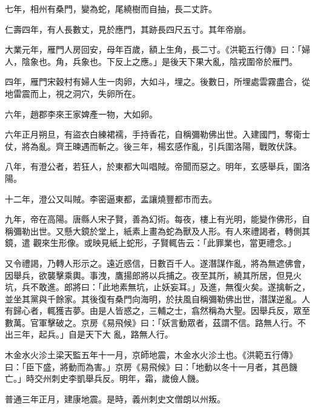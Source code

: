 \begin{pinyinscope}
 七年，相州有桑門，變為蛇，尾繞樹而自抽，長二丈許。



 仁壽四年，有人長數丈，見於應門，其跡長四尺五寸。其年帝崩。



 大業元年，雁門人房回安，母年百歲，額上生角，長二寸。《洪範五行傳》曰：「婦人，陰象也。角，兵象也。下反上之應。」是後天下果大亂，陰戎圍帝於雁門。



 四年，雁門宋穀村有婦人生一肉卵，大如斗，埋之。後數日，所埋處雲霧盡合，從地雷震而上，視之洞穴，失卵所在。



 六年，趙郡李來王家婢產一物，大如卵。



 六年正月朔旦，有盜衣白練裙襦，手持香花，自稱彌勒佛出世。入建國門，奪衛士仗，將為亂。齊王暕遇而斬之。後三年，楊玄感作亂，引兵圍洛陽，戰敗伏誅。



 八年，有澄公者，若狂人，於東都大叫唱賊。帝聞而惡之。明年，玄感舉兵，圍洛陽。



 十二年，澄公又叫賊。李密逼東都，孟讓燒豐都市而去。



 九年，帝在高陽。唐縣人宋子賢，善為幻術。每夜，樓上有光明，能變作佛形，自稱彌勒出世。又懸大鏡於堂上，紙素上畫為蛇為獸及人形。有人來禮謁者，轉側其鏡，遣
 觀來生形像。或映見紙上蛇形，子賢輒告云：「此罪業也，當更禮念。」



 又令禮謁，乃轉人形示之。遠近惑信，日數百千人。遂潛謀作亂，將為無遮佛會，因舉兵，欲襲擊乘輿。事洩，鷹揚郎將以兵捕之。夜至其所，繞其所居，但見火坑，兵不敢進。郎將曰：「此地素無坑，止妖妄耳。」及進，無復火矣。遂擒斬之，並坐其黨與千餘家。其後復有桑門向海明，於扶風自稱彌勒佛出世，潛謀逆亂。人有歸心者，輒獲吉夢。由是人皆惑之，三輔之士，翕然稱為大聖。因舉兵反，眾至數萬。官軍擊破之。京房《易飛候》曰：「妖言動眾者，茲謂不信。路無人行。不出三年，起兵。」自是天下大
 亂，路無人行。



 木金水火沴土梁天監五年十一月，京師地震，木金水火沴土也。《洪範五行傳》曰：「臣下盛，將動而為害。」京房《易飛候》曰：「地動以冬十一月者，其邑饑亡。」時交州刺史李凱舉兵反。明年，霜，歲儉人饑。



 普通三年正月，建康地震。是時，義州刺史文僧朗以州叛。




\end{pinyinscope}

